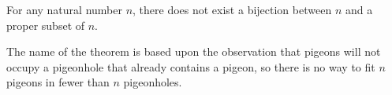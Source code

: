 \documentclass[12pt]{article}
\begin{document}
For any natural number $n$, there does not exist a bijection between $n$ and a proper subset of $n$.

The name of the theorem is based upon the observation that pigeons will not occupy a pigeonhole that already contains a pigeon, so there is no way to fit $n$ pigeons in fewer than $n$ pigeonholes.
\end{document}
